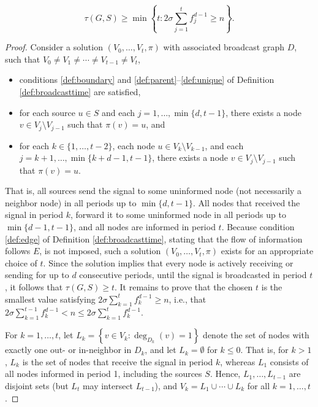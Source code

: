 \begin{proposition}
\begin{equation*}
\label{lem:lbreg1}
	\tau(G,S)\geq\min\left\{t:2\sigma\sum\limits_{j=1}^tf^{d-1}_j\geq n\right\}.
\end{equation*}
\label{prop:lbfib}
\end{proposition}
\begin{proof}

Consider a solution $\left(V_0,\ldots,V_t,\pi\right)$ with associated broadcast graph $D$, such that $V_0\neq V_1\neq\cdots\neq V_{t-1}\neq V_t$, 
\begin{itemize}
  \item conditions \ref{def:boundary} and \ref{def:parent}--\ref{def:unique} of Definition \ref{def:broadcasttime} are satisfied,
  \item for each source $u\in S$ and each $j=1,\ldots,\min\{d,t-1\}$, there exists a node $v\in V_j\setminus V_{j-1}$ such that $\pi(v)=u$, and
  \item for each $k\in\{1,\ldots,t-2\}$, each node $u\in V_k\setminus V_{k-1}$, and each $j=k+1,\ldots,\min\{k+d-1,t-1\}$,
        there exists a node $v\in V_j\setminus V_{j-1}$ such that $\pi(v)=u$.
\end{itemize}
\noindent
That is, all sources send the signal to some uninformed node (not necessarily a neighbor node) in all periods up to $\min\{d,t-1\}$.
All nodes that received the signal in period $k$, forward it to some uninformed node in all periods up to $\min\{d-1,t-1\}$,
and all nodes are informed in period $t$.
Because condition \ref{def:edge} of Definition \ref{def:broadcasttime}, stating that the flow of information follows $E$, is not imposed,
such a solution $\left(V_0,\ldots,V_t,\pi\right)$ exists for an appropriate choice of $t$.
Since the solution implies that every node is actively receiving or sending for up to $d$ consecutive periods, until the signal is broadcasted in period $t$,
it follows that $\tau(G,S)\geq t$.
It remains to prove that the chosen $t$ is the smallest value satisfying $2\sigma\sum_{k=1}^tf_k^{d-1}\geq n$, i.e.,
that $2\sigma\sum_{k=1}^{t-1}f_k^{d-1}<n\leq 2\sigma\sum_{k=1}^tf_k^{d-1}$.

For $k=1,\ldots,t$, let $L_k=\left\{v\in V_k:\deg_{D_k}(v)=1\right\}$ denote the set of nodes with exactly one out- or in-neighbor in $D_k$,
and let $L_k=\emptyset$ for $k\leq 0$.
That is, for $k>1$, $L_k$ is the set of nodes that receive the signal in period $k$, whereas $L_1$ consists of all nodes informed in period 1, including the sources $S$.
Hence, $L_1,\ldots,L_{t-1}$ are disjoint sets (but $L_t$ may intersect $L_{t-1}$), and $V_k=L_1\cup\cdots\cup L_k$ for all $k=1,\ldots,t$.


\end{proof}
